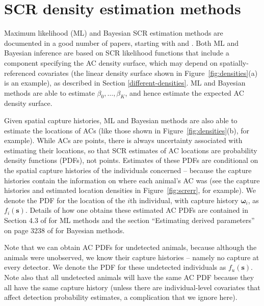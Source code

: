 \documentclass[useAMS,usenatbib,referee]{biom}
\begin{document}
\section{SCR density estimation methods} \label{secrmethods}

Maximum likelihood (ML) and Bayesian SCR estimation methods are documented in a good number of papers, starting with \cite{Borchers+Efford:08} and \cite{Royle+Young:08}. Both ML and Bayesian inference are based on SCR likelihood functions that include a component specifying the AC density surface, which may depend on spatially-referenced covariates (the linear density surface shown in Figure~\ref{fig:densities}(a) is an example), as described in Section \ref{different-densities}. ML and Bayesian methods are able to estimate $\beta_0,\ldots,\beta_K$, and hence estimate the expected AC density surface. 

Given spatial capture histories, ML and Bayesian methods are also able to estimate the locations of ACs (like those shown in Figure~\ref{fig:densities}(b), for example). While ACs are points, there is always uncertainty associated with estimating their locations, so that SCR estimates of AC locations are probability density functions (PDFs), not points. Estimates of these PDFs are conditional on the spatial capture histories of the individuals concerned -- because the capture histories contain the information on where each animal's AC was (see the capture histories and estimated location densities in Figure~\ref{fig:screrr}, for example). We denote the PDF for the location of the $i$th individual, with capture history $\bm{\omega}_i$, as $f_i(\bm{s})$. Details of how one obtains these estimated AC PDFs are contained in Section 4.3 of \cite{Borchers+Efford:08} for ML methods and the section ``Estimating derived parameters'' on page 3238 of \cite{Royle+al:09b} for Bayesian methods.

Note that we can obtain AC PDFs for undetected animals, because although the animals were unobserved, we know their capture histories -- namely no capture at every detector. We denote the PDF for these undetected individuals as $f_u(\bm{s})$. Note also that all undetected animals will have the same AC PDF because they all have the same capture history (unless there are individual-level covariates that affect detection probability estimates, a complication that we ignore here). 
\end{document}
